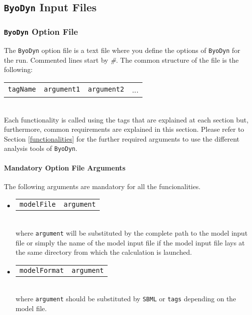 \documentclass[a4paper, 11pt]{article}
\begin{document}
\subsection{\texttt{ByoDyn} Input Files}
\subsubsection{\texttt{ByoDyn} Option File} \label{optionFile}
The \texttt{ByoDyn} option file is a text file where you define the options of \texttt{ByoDyn} for the run.
Commented lines start by \emph{\#}.
The common structure of the file is the following:\\
\begin{tabular}{cccc}
  \texttt{tagName}&\texttt{argument1}&\texttt{argument2}&...
\end{tabular}\\
Each functionality is called using the tags that are explained at each section but, furthermore, common requirements are explained in this section. Please refer to Section \ref{functionalities} for the further required arguments to use the different analysis tools of \texttt{ByoDyn}.
\paragraph{Mandatory Option File Arguments}
The following arguments are mandatory for all the funcionalities.
\begin{itemize}
\item
  \begin{tabular}{cc}
    \texttt{modelFile}&\texttt{argument}
  \end{tabular}\\[1.5ex]
  where \texttt{argument} will be substituted by the complete path to the model input file or simply the name of the model input file if the model input file lays at the same directory from which the calculation is launched.
\item
  \begin{tabular}{cc}
    \texttt{modelFormat}&\texttt{argument}
  \end{tabular}\\[1.5ex]
  where \texttt{argument} should be substituted by \texttt{SBML} or \texttt{tags} depending on the model file.
\end{itemize}
\end{document}
